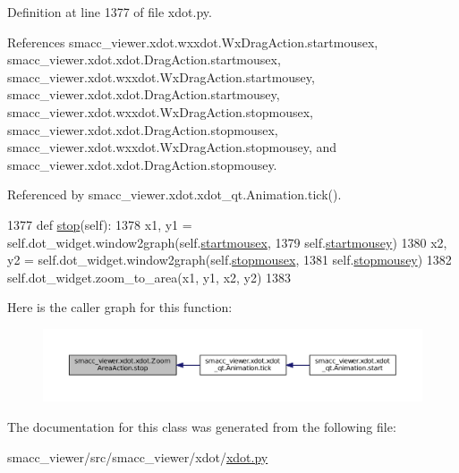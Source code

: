 Definition at line 1377 of file xdot.\+py.



References smacc\+\_\+viewer.\+xdot.\+wxxdot.\+Wx\+Drag\+Action.\+startmousex, smacc\+\_\+viewer.\+xdot.\+xdot.\+Drag\+Action.\+startmousex, smacc\+\_\+viewer.\+xdot.\+wxxdot.\+Wx\+Drag\+Action.\+startmousey, smacc\+\_\+viewer.\+xdot.\+xdot.\+Drag\+Action.\+startmousey, smacc\+\_\+viewer.\+xdot.\+wxxdot.\+Wx\+Drag\+Action.\+stopmousex, smacc\+\_\+viewer.\+xdot.\+xdot.\+Drag\+Action.\+stopmousex, smacc\+\_\+viewer.\+xdot.\+wxxdot.\+Wx\+Drag\+Action.\+stopmousey, and smacc\+\_\+viewer.\+xdot.\+xdot.\+Drag\+Action.\+stopmousey.



Referenced by smacc\+\_\+viewer.\+xdot.\+xdot\+\_\+qt.\+Animation.\+tick().


\begin{DoxyCode}
1377     \textcolor{keyword}{def }\hyperlink{classsmacc__viewer_1_1xdot_1_1xdot_1_1ZoomAreaAction_a2d7dbbc17fbc5ba4f32fa36242cb0005}{stop}(self):
1378         x1, y1 = self.dot\_widget.window2graph(self.\hyperlink{classsmacc__viewer_1_1xdot_1_1xdot_1_1DragAction_a74ba8eeebd63d491c9f098a61cf8d3e7}{startmousex},
1379                                               self.\hyperlink{classsmacc__viewer_1_1xdot_1_1xdot_1_1DragAction_af2d60d0dc600392bdee19260e8a6dabc}{startmousey})
1380         x2, y2 = self.dot\_widget.window2graph(self.\hyperlink{classsmacc__viewer_1_1xdot_1_1xdot_1_1DragAction_ad7a955bd4e82ee45c702fcdc045b8b8e}{stopmousex},
1381                                               self.\hyperlink{classsmacc__viewer_1_1xdot_1_1xdot_1_1DragAction_a19d174cf426a237cf98b607bc40b9b58}{stopmousey})
1382         self.dot\_widget.zoom\_to\_area(x1, y1, x2, y2)
1383 
\end{DoxyCode}


Here is the caller graph for this function\+:
\nopagebreak
\begin{figure}[H]
\begin{center}
\leavevmode
\includegraphics[width=350pt]{classsmacc__viewer_1_1xdot_1_1xdot_1_1ZoomAreaAction_a2d7dbbc17fbc5ba4f32fa36242cb0005_icgraph}
\end{center}
\end{figure}




The documentation for this class was generated from the following file\+:\begin{DoxyCompactItemize}
\item 
smacc\+\_\+viewer/src/smacc\+\_\+viewer/xdot/\hyperlink{xdot_8py}{xdot.\+py}\end{DoxyCompactItemize}
